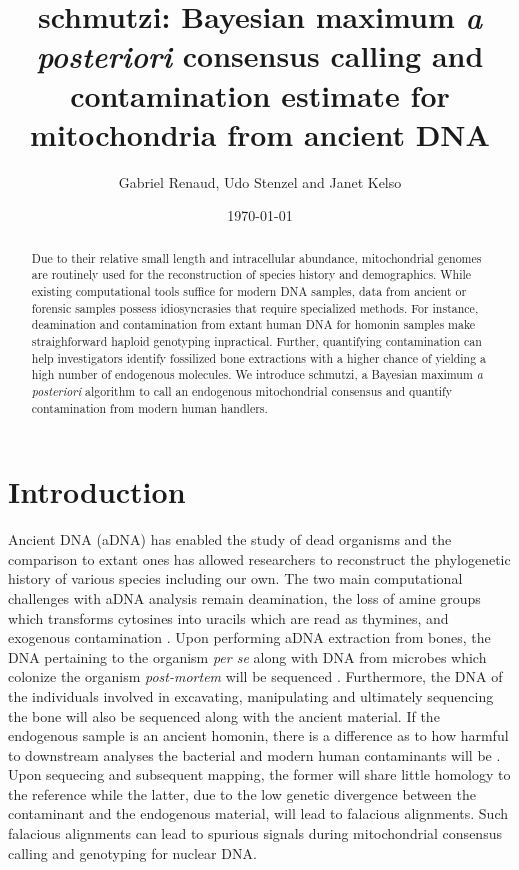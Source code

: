\documentclass[a4paper,12pt]{article}
\begin{document}

\title{schmutzi: Bayesian maximum {\it a posteriori} consensus calling and contamination estimate for mitochondria from ancient DNA }
\date{\today}
\author{Gabriel Renaud, Udo Stenzel and Janet Kelso}


\maketitle

\tableofcontents
\begin{abstract}
Due to their relative small length and intracellular abundance, mitochondrial genomes are routinely used for the reconstruction of species history and demographics. While existing computational tools suffice for modern DNA samples, data from ancient or forensic samples possess idiosyncrasies that require specialized methods. For instance, deamination and contamination from extant human DNA for homonin samples make straighforward haploid genotyping inpractical. Further, quantifying contamination can help investigators identify fossilized  bone extractions with a higher chance of yielding a high number of endogenous molecules. We introduce schmutzi, a Bayesian maximum {\it a posteriori} algorithm to call an endogenous mitochondrial consensus and quantify contamination from modern human handlers. 
\end{abstract}

\section{Introduction}

Ancient DNA (aDNA) has enabled the study of dead organisms and the comparison to extant ones has allowed researchers to reconstruct the phylogenetic history of various species including our own. The two main computational challenges with aDNA analysis remain deamination, the loss of amine groups which transforms cytosines into uracils which are read as thymines, and exogenous contamination \cite{briggs2007patterns}. Upon performing aDNA extraction from bones, the DNA pertaining to the organism {\it per se} along with DNA from microbes which colonize the organism {\it post-mortem} will be sequenced \cite{sidow1991bacterial,handt1994ancient}. Furthermore, the DNA of the individuals involved in excavating, manipulating and ultimately sequencing the bone will also be sequenced along with the ancient material. If the endogenous sample is an ancient homonin, there is a difference as to how harmful to downstream analyses the bacterial and modern human contaminants will be . Upon sequecing and subsequent mapping, the former will share little homology to the reference while the latter, due to the low genetic divergence between the contaminant and the endogenous material, will lead to falacious alignments. Such falacious alignments can lead to spurious signals during mitochondrial consensus calling and genotyping for nuclear DNA. 
\end{document}
